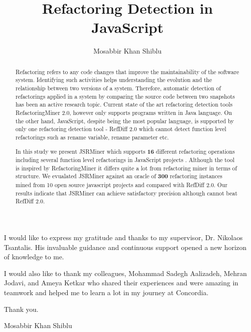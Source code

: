 \documentclass[letterpaper,12pt,onecolumn,final]{report}
\author{Mosabbir Khan Shiblu}
\title{Refactoring Detection in JavaScript}
\begin{document}
\begin{abstract}
{%

Refactoring refers to any code changes that improve the maintainability of the software system. Identifying such activities helps understanding the evolution and the relationship between two versions of a system. Therefore, automatic detection of refactorings applied in a system by comparing the source code between two snapshots has been an active research topic. Current state of the art refactoring detection tools RefactoringMiner 2.0, however only supports programs written in Java language. On the other hand, JavaScript, despite being the most popular language, is supported by only one refactoring detection tool - RefDiff 2.0 which cannot detect function level refactorings such as rename variable, rename parameter etc. 

In this study we present JSRMiner which supports \textbf{16} different refactoring operations including several function level refactorings in JavaScript projects . Although the tool is inspired by RefactoringMiner it differs quite a lot from refactoring miner in terms of structure. We evualated JSRMiner against an oracle of \textbf{300} refactoring instances mined from 10 open source javascript projects and compared with RefDiff 2.0. Our results indicate that JSRMiner can achieve satisfactory precision although cannot beat RefDiff 2.0.

}\end{abstract}


\begin{acknowledgments}

I would like to express my gratitude and thanks to my supervisor, Dr. Nikolaos Tsantalis. His invaluable guidance and continuous support opened a new horizon of knowledge to me.

I would also like to thank my colleagues, Mohammad Sadegh Aalizadeh, Mehran Jodavi, and Ameya Ketkar who shared their experiences and were amazing in teamwork and helped me to learn a lot in my journey at Concordia.

\vspace{5mm}

Thank you.

Mosabbir Khan Shiblu
	
\end{acknowledgments}
\end{document}
